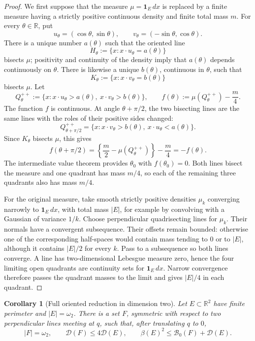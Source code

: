 \documentclass[11pt]{amsart}
\newtheorem{corollary}[theorem]{Corollary}
\theoremstyle{definition}
\newcommand{\R}{\mathbb R}
\newcommand{\Def}{\mathcal D}
\begin{document}
\begin{proof}
We first suppose that the measure \(\mu=\mathbf1_E\,dx\) is replaced
by a finite measure having a strictly positive continuous density and
finite total mass \(m\).  For every \(\theta\in\R\), put
\[
   u_\theta=(\cos\theta,\sin\theta),
   \qquad v_\theta=(-\sin\theta,\cos\theta).
\]
There is a unique number \(a(\theta)\) such that the oriented line
\[
   H_\theta:=\{x:x\cdot u_\theta=a(\theta)\}
\]
bisects \(\mu\); positivity and continuity of the density imply that
\(a(\theta)\) depends continuously on \(\theta\).  There is likewise
a unique \(b(\theta)\), continuous in \(\theta\), such that
\[
   K_\theta:=\{x:x\cdot v_\theta=b(\theta)\}
\]
bisects \(\mu\).  Let
\[
   Q_\theta^{++}
   :=\{x:x\cdot u_\theta>a(\theta),\
          x\cdot v_\theta>b(\theta)\},
   \qquad
   f(\theta):=\mu(Q_\theta^{++})-\frac m4.
 \]
The function \(f\) is continuous.  At angle \(\theta+\pi/2\), the
two bisecting lines are the same lines with the roles of their
positive sides changed:
\[
   Q_{\theta+\pi/2}^{++}
   =\{x:x\cdot v_\theta>b(\theta),\
          x\cdot u_\theta<a(\theta)\}.
 \]
Since \(K_\theta\) bisects \(\mu\), this gives
\[
   f(\theta+\pi/2)
   =\left\{\frac m2-\mu(Q_\theta^{++})\right\}-\frac m4
   =-f(\theta).
 \]
The intermediate value theorem provides \(\theta_0\) with
\(f(\theta_0)=0\).  Both lines bisect the measure and one quadrant
has mass \(m/4\), so each of the remaining three quadrants also has
mass \(m/4\).

For the original measure, take smooth strictly positive densities
\(\mu_k\) converging narrowly to \(\mathbf1_E\,dx\), with total mass
\(|E|\), for example by convolving with a Gaussian of variance
\(1/k\).  Choose perpendicular quadrisecting lines for \(\mu_k\).
Their normals have a convergent subsequence.  Their offsets remain
bounded: otherwise one of the corresponding half-spaces would contain
mass tending to \(0\) or to \(|E|\), although it contains
\(|E|/2\) for every \(k\).  Pass to a subsequence so both lines
converge.  A line has two-dimensional Lebesgue measure zero, hence
the four limiting open quadrants are continuity sets for
\(\mathbf1_E\,dx\).  Narrow convergence therefore passes the
quadrant masses to the limit and gives \(|E|/4\) in each quadrant.
\end{proof}

\begin{corollary}[Full oriented reduction in dimension two]
\label{cor:oriented-reduction-plane}
Let \(E\subset\R^2\) have finite perimeter and \(|E|=\omega_2\).
There is a set \(F\), symmetric with respect to two perpendicular
lines meeting at \(q\), such that, after translating \(q\) to \(0\),
\[
   |F|=\omega_2,\qquad
   \Def(F)\le4\Def(E),\qquad
   \beta(E)^2\le\mathcal B_0(F)+\Def(E).
\tag{6.7n}\label{eq:planar-oriented-reduction}
\]
\end{corollary}
\end{document}
